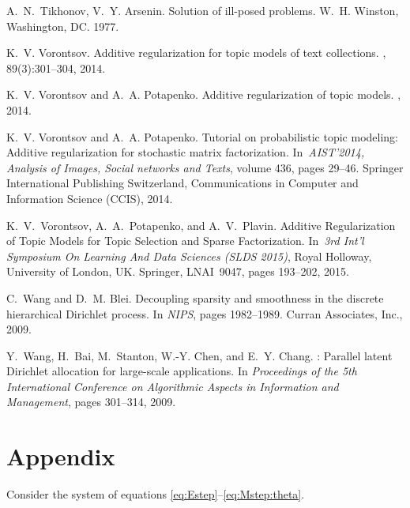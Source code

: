 \documentclass{acm_proc_article-sp}
\begin{document}
\begin{thebibliography}{10}
A.~N.~Tikhonov, V.~Y. Arsenin. 
\newblock Solution of ill-posed problems. 
\newblock W.~H. Winston, Washington, DC. 1977.

K.~V. Vorontsov.
\newblock Additive regularization for topic models of text collections.
, 89(3):301--304, 2014.

K.~V. Vorontsov and A.~A. Potapenko.
\newblock Additive regularization of topic models.
, 2014.

K.~V. Vorontsov and A.~A. Potapenko.
\newblock Tutorial on probabilistic topic modeling: Additive regularization for stochastic matrix factorization.
\newblock In~{\em AIST'2014, Analysis of Images, Social networks and Texts},
  volume 436, pages 29--46. Springer International Publishing Switzerland,
  Communications in Computer and Information Science (CCIS), 2014.

K.~V.~Vorontsov, A.~A.~Potapenko, and A.~V.~Plavin.
\newblock Additive Regularization of Topic Models for Topic Selection and Sparse Factorization.
\newblock In~{\em 3rd Int'l Symposium On Learning And Data Sciences (SLDS 2015)},
    Royal Holloway, University of London, UK.
    Springer, LNAI~9047, pages 193--202, 2015.

C.~Wang and D.~M. Blei.
\newblock Decoupling sparsity and smoothness in the discrete hierarchical Dirichlet process.
\newblock In {\em NIPS}, pages 1982--1989. Curran Associates, Inc., 2009.

Y.~Wang, H.~Bai, M.~Stanton, W.-Y. Chen, and E.~Y. Chang.
: Parallel latent {D}irichlet allocation for large-scale applications.
\newblock In {\em Proceedings of the 5th International Conference on
  Algorithmic Aspects in Information and Management}, pages 301--314, 2009.

\end{thebibliography}

\section*{Appendix}

Consider the system of equations \eqref{eq:Estep}--\eqref{eq:Mstep:theta}.
\end{document}
